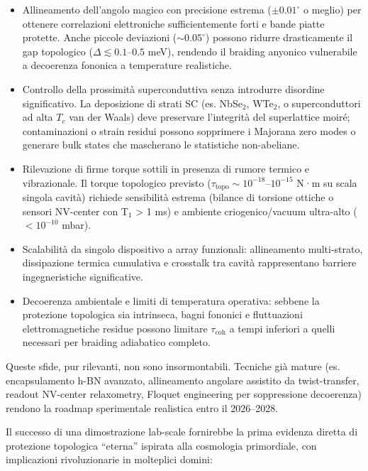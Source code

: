 \documentclass[11pt,a4paper]{article}
\theoremstyle{plain}
\theoremstyle{definition}
\begin{document}
\begin{itemize}
    \item Allineamento dell'angolo magico con precisione estrema ($\pm 0.01^\circ$ o meglio) per ottenere correlazioni elettroniche sufficientemente forti e bande piatte protette. Anche piccole deviazioni ($\sim 0.05^\circ$) possono ridurre drasticamente il gap topologico ($\Delta \lesssim 0.1$--$0.5$ meV), rendendo il braiding anyonico vulnerabile a decoerenza fononica a temperature realistiche.
    \item Controllo della prossimità superconduttiva senza introdurre disordine significativo. La deposizione di strati SC (es. NbSe$_2$, WTe$_2$, o superconduttori ad alta $T_c$ van der Waals) deve preservare l'integrità del superlattice moiré; contaminazioni o strain residui possono sopprimere i Majorana zero modes o generare bulk states che mascherano le statistiche non-abeliane.
    \item Rilevazione di firme torque sottili in presenza di rumore termico e vibrazionale. Il torque topologico previsto ($\tau_{\mathrm{topo}} \sim 10^{-18}$--$10^{-15}$ N·m su scala singola cavità) richiede sensibilità estrema (bilance di torsione ottiche o sensori NV-center con T$_1$ > 1 ms) e ambiente criogenico/vacuum ultra-alto ($< 10^{-10}$ mbar).
    \item Scalabilità da singolo dispositivo a array funzionali: allineamento multi-strato, dissipazione termica cumulativa e crosstalk tra cavità rappresentano barriere ingegneristiche significative.
    \item Decoerenza ambientale e limiti di temperatura operativa: sebbene la protezione topologica sia intrinseca, bagni fononici e fluttuazioni elettromagnetiche residue possono limitare $\tau_{\mathrm{coh}}$ a tempi inferiori a quelli necessari per braiding adiabatico completo.
\end{itemize}

Queste sfide, pur rilevanti, non sono insormontabili. Tecniche già mature (es. encapsulamento h-BN avanzato, allineamento angolare assistito da twist-transfer, readout NV-center relaxometry, Floquet engineering per soppressione decoerenza) rendono la roadmap sperimentale realistica entro il 2026--2028.

Il successo di una dimostrazione lab-scale fornirebbe la prima evidenza diretta di protezione topologica ``eterna'' ispirata alla cosmologia primordiale, con implicazioni rivoluzionarie in molteplici domini:
\end{document}
